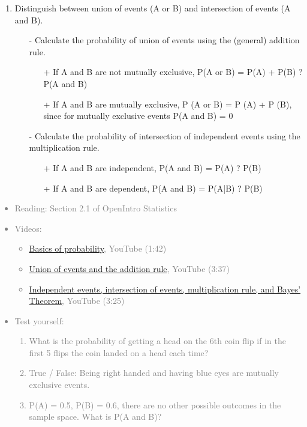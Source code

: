 \documentclass[11pt]{article}
\newcommand{\gray}[1]{\textcolor{gray}{#1}}
\begin{document}
\begin{enumerate}
\item Distinguish between union of events (A or B) and intersection of events (A and B).
\begin{itemize}
\item[-] Calculate the probability of union of events using the (general) addition rule.
\begin{itemize}
\item[+] If A and B are not mutually exclusive, P(A or B) = P(A) + P(B) ? P(A and B) 
\item[+] If A and B are mutually exclusive, P (A or B) = P (A) + P (B), since for mutually exclusive events P(A and B) = 0 
\end{itemize}
\item[-] Calculate the probability of intersection of independent events using the multiplication rule.
\begin{itemize}
\item[+] If A and B are independent, P(A and B) = P(A) ? P(B) 
\item[+] If A and B are dependent, P(A and B) = P(A|B) ? P(B) 
\end{itemize}
\end{itemize}

\end{enumerate}

\gray{
{\it
\vspace{-0.75cm}
\begin{itemize}
\renewcommand{\labelitemi}{{\textcolor{dark}{$\ast$}}}
\item Reading: Section 2.1 of OpenIntro Statistics
\item Videos:
\begin{itemize}
\item \href{http://www.youtube.com/watch?v=zMv-zcO8Jmk}{Basics of probability}, YouTube (1:42) 
\item \href{http://www.youtube.com/watch?v=DOooyE6liLY}{Union of events and the addition rule}, YouTube (3:37)
\item \href{http://www.youtube.com/watch?v=Q_7PR9kRXWs}{Independent events, intersection of events, multiplication rule, and Bayes' Theorem}, YouTube (3:25)
\end{itemize}
\item Test yourself:
\begin{enumerate}
\item What is the probability of getting a head on the 6th coin flip if in the first 5 flips the coin landed on a head each time?
\item True / False: Being right handed and having blue eyes are mutually exclusive events.
\item P(A) = 0.5, P(B) = 0.6, there are no other possible outcomes in the sample space. What is P(A and B)?
\end{enumerate}
\end{itemize}
}}
\end{document}

